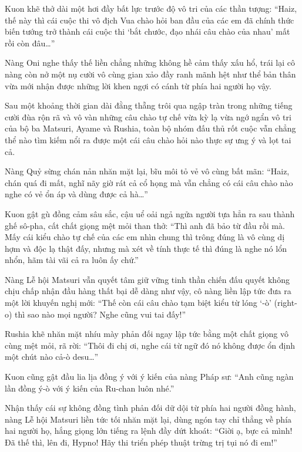 \documentclass[../main.tex]{subfiles}
\begin{document}
Kuon khẽ thở dài một hơi đầy bất lực trước độ vô tri của các thần tượng: ``Haiz, thế này thì cái cuộc thi vô địch Vua chào hỏi ban đầu của các em đã chính thức biến tướng trở thành cái cuộc thi `bắt chước, đạo nhái câu chào của nhau' mất rồi còn đâu\dots''

Nàng Oni nghe thấy thế liền chẳng những không hề cảm thấy xấu hổ, trái lại cô nàng còn nở một nụ cười vô cùng gian xảo đầy ranh mãnh hệt như thể bản thân vừa mới nhận được những lời khen ngợi có cánh từ phía hai người họ vậy.

\ct

Sau một khoảng thời gian dài đằng thẵng trôi qua ngập tràn trong những tiếng cười đùa rộn rã và vô vàn những câu chào tự chế vừa kỳ lạ vừa ngớ ngẩn vô tri của bộ ba Matsuri, Ayame và Rushia, toàn bộ nhóm đấu thủ rốt cuộc vẫn chẳng thể nào tìm kiếm nổi ra được một cái câu chào hỏi nào thực sự ưng ý và lọt tai cả.

Nàng Quỷ sừng chán nản nhăn mặt lại, bĩu môi tỏ vẻ vô cùng bất mãn: ``Haiz, chán quá đi mất, nghĩ nãy giờ rát cả cổ họng mà vẫn chẳng có cái câu chào nào nghe có vẻ ổn áp và dùng được cả hà\dots''

Kuon gật gù đồng cảm sâu sắc, cậu uể oải ngả ngửa người tựa hẳn ra sau thành ghế sô-pha, cất chất giọng mệt mỏi than thở: ``Thì anh đã bảo từ đầu rồi mà. Mấy cái kiểu chào tự chế của các em nhìn chung thì trông đúng là vô cùng dị hợm và độc lạ thật đấy, nhưng mà xét về tính thực tế thì đúng là nghe nó lổn nhổn, hãm tài vãi cả ra luôn ấy chứ.''

Nàng Lễ hội Matsuri vẫn quyết tâm giữ vững tinh thần chiến đấu quyết không chịu chấp nhận đầu hàng thất bại dễ dàng như vậy, cô nàng liền lập tức đưa ra một lời khuyến nghị mới: ``Thế còn cái câu chào tạm biệt kiểu từ lóng `-ò' (right-o) thì sao nào mọi người? Nghe cũng vui tai đấy!''

Rushia khẽ nhăn mặt nhíu mày phản đối ngay lập tức bằng một chất giọng vô cùng mệt mỏi, rã rời: ``Thôi đi chị ơi, nghe cái từ ngữ đó nó không được ổn định một chút nào cả-ò desu\dots''

Kuon cũng gật đầu lia lịa đồng ý với ý kiến của nàng Pháp sư: ``Anh cũng ngàn lần đồng ý-ò với ý kiến của Ru-chan luôn nhé.''

Nhận thấy cái sự không đồng tình phản đối dữ dội từ phía hai người đồng hành, nàng Lễ hội Matsuri liền tức tối nhăn mặt lại, dùng ngón tay chỉ thẳng về phía hai người họ, hắng giọng lớn tiếng ra lệnh đầy dứt khoát: ``Giời ạ, bực cả mình! Đã thế thì, lên đi, Hypno! Hãy thi triển phép thuật trừng trị tụi nó đi em!''
\end{document}

